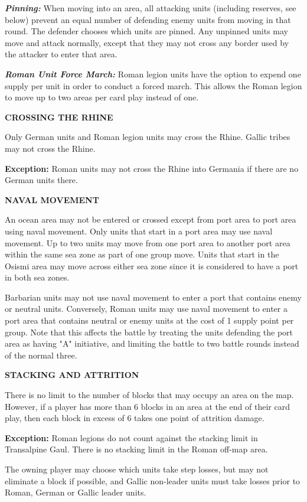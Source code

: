 \textit{\textbf{Pinning:}} When moving into an area, all attacking units (including reserves, see below) prevent an equal number of defending enemy units from moving in that round. The defender chooses which units are pinned. Any unpinned units may move and attack normally, except that they may not cross any border used by the attacker to enter that area.

\textit{\textbf{Roman Unit Force March:}} Roman legion units have the option to expend one supply per unit in order to conduct a forced march. This allows the Roman legion to move up to two areas per card play instead of one.

\textbf{CROSSING THE RHINE}
\par
Only German units and Roman legion units may cross the Rhine. Gallic tribes may not cross the Rhine.

\textbf{Exception:} Roman units may not cross the Rhine into Germania if there are no German units there.

\textbf{NAVAL MOVEMENT}
\par
An ocean area may not be entered or crossed except from port area to port area using naval movement. Only units that start in a port area may use naval movement. Up to two units may move from one port area to another port area within the same sea zone as part of one group move. Units that start in the Osismi area may move across either sea zone since it is considered to have a port in both sea zones.

Barbarian units may not use naval movement to enter a port that contains enemy or neutral units. Conversely, Roman units may use naval movement to enter a port area that contains neutral or enemy units at the cost of 1 supply point per group. Note that this affects the battle by treating the units defending the port area as having "A" initiative, and limiting the battle to two battle rounds instead of the normal three.

\textbf{STACKING AND ATTRITION}
\par
There is no limit to the number of blocks that may occupy an area on the map. However, if a player has more than 6 blocks in an area at the end of their card play, then each block in excess of 6 takes one point of attrition damage.

\textbf{Exception:} Roman legions do not count against the stacking limit in Transalpine Gaul. There is no stacking limit in the Roman off-map area.

The owning player may choose which units take step losses, but may not eliminate a block if possible, and Gallic non-leader units must take losses prior to Roman, German or Gallic leader units.

